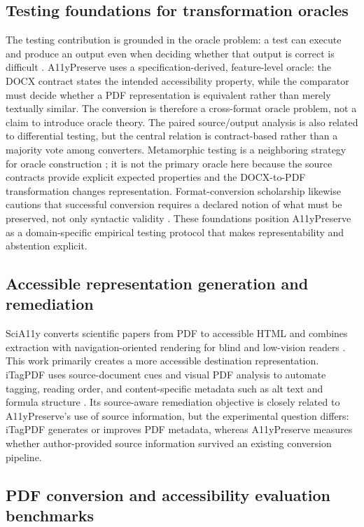 \subsection{Testing foundations for transformation oracles}
The testing contribution is grounded in the oracle problem: a test can execute and produce an output even when deciding whether that output is correct is difficult \cite{barr2015oracle}. A11yPreserve uses a specification-derived, feature-level oracle: the DOCX contract states the intended accessibility property, while the comparator must decide whether a PDF representation is equivalent rather than merely textually similar. The conversion is therefore a cross-format oracle problem, not a claim to introduce oracle theory. The paired source/output analysis is also related to differential testing, but the central relation is contract-based rather than a majority vote among converters. Metamorphic testing is a neighboring strategy for oracle construction \cite{segura2016metamorphic}; it is not the primary oracle here because the source contracts provide explicit expected properties and the DOCX-to-PDF transformation changes representation. Format-conversion scholarship likewise cautions that successful conversion requires a declared notion of what must be preserved, not only syntactic validity \cite{sperberg2011conversion}. These foundations position A11yPreserve as a domain-specific empirical testing protocol that makes representability and abstention explicit.

\subsection{Accessible representation generation and remediation}

SciA11y converts scientific papers from PDF to accessible HTML and combines extraction with navigation-oriented rendering for blind and low-vision readers \cite{wang2021scia11y}. This work primarily creates a more accessible destination representation. iTagPDF uses source-document cues and visual PDF analysis to automate tagging, reading order, and content-specific metadata such as alt text and formula structure \cite{mowar2026}. Its source-aware remediation objective is closely related to A11yPreserve's use of source information, but the experimental question differs: iTagPDF generates or improves PDF metadata, whereas A11yPreserve measures whether author-provided source information survived an existing conversion pipeline.

\subsection{PDF conversion and accessibility evaluation benchmarks}


